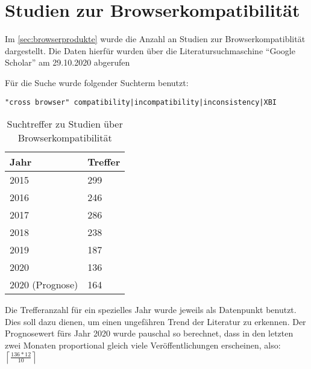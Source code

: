 \section{Studien zur Browserkompatibilität}
\label{sec:studien-zur-browser-kompatibilitaet}

Im \autoref{sec:browserprodukte} wurde die Anzahl an Studien zur Browserkompatiblität dargestellt. Die Daten hierfür wurden über die Literatursuchmaschine \enquote{Google Scholar} am 29.10.2020 abgerufen

Für die Suche wurde folgender Suchterm benutzt:
\begin{verbatim}
"cross browser" compatibility|incompatibility|inconsistency|XBI
\end{verbatim}

\begin{wraptable}[12]{r}{0.4\linewidth}
\centering
\begin{tabular}{|l|l|}
  \hline
  Jahr & Treffer \\
  \hline
  2015 & 299 \\
  \hline
  2016 & 246 \\
  \hline
  2017 & 286 \\
  \hline
  2018 & 238 \\
  \hline
  2019 & 187 \\
  \hline
  2020 & 136 \\
  \hline
  2020 (Prognose) & 164 \\
  \hline
\end{tabular}
\caption{Suchtreffer zu Studien über Browserkompatibilität}
\end{wraptable}

\def\lc{\left\lceil}   
\def\rc{\right\rceil}

Die Trefferanzahl für ein spezielles Jahr wurde jeweils als Datenpunkt benutzt. Dies soll dazu dienen, um einen ungefähren Trend der Literatur zu erkennen. Der Prognosewert fürs Jahr 2020 wurde pauschal so berechnet, dass in den letzten zwei Monaten proportional gleich viele Veröffentlichungen erscheinen, also: \( \lc \frac{136 * 12}{10} \rc\ \)